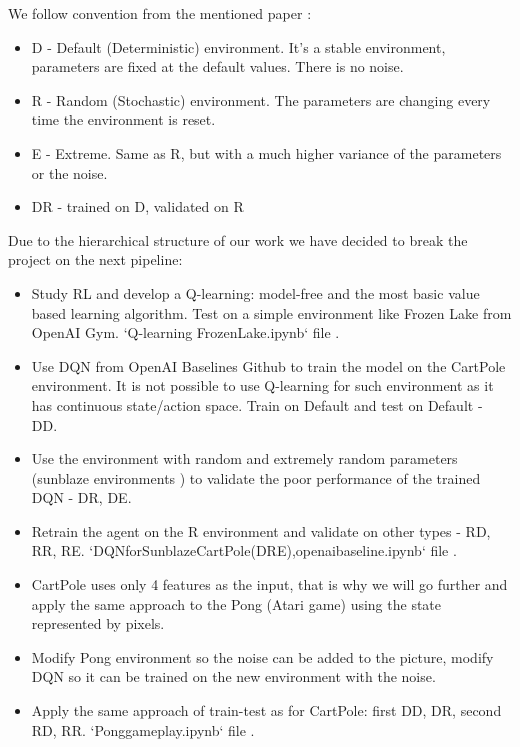 We follow convention from the mentioned paper \cite{GeneralizationPaper}:
\begin{itemize}
    \item D - Default (Deterministic) environment. It's a stable environment, parameters are fixed at the default values. There is no noise.
    \item R - Random (Stochastic) environment. The parameters are changing every time the environment is reset.
    \item E - Extreme. Same as R, but with a much higher variance of the parameters or the noise.
    \item DR - trained on D, validated on R
\end{itemize}

Due to the hierarchical structure of our work we have decided to break the project on the next pipeline:
\begin{itemize}
    \item Study RL and develop a Q-learning: model-free and the most basic value based learning algorithm. Test on a simple environment like Frozen Lake from OpenAI Gym. `Q-learning FrozenLake.ipynb` file \cite{Project}.
    \item Use DQN from OpenAI Baselines Github to train the model on the CartPole environment. It is not possible to use Q-learning for such environment as it has continuous state/action space. Train on Default and test on Default - DD.
    \item Use the environment with random and extremely random parameters (sunblaze environments \cite{Sunblaze}) to validate the poor performance of the trained DQN - DR, DE.
    \item Retrain the agent on the R environment and validate on other types - RD, RR, RE. `DQN\textunderscore for\textunderscore Sunblaze\textunderscore CartPole\textunderscore (DRE),\textunderscore openai\textunderscore baseline.ipynb` file \cite{Project}.
    \item CartPole uses only 4 features as the input, that is why we will go further and apply the same approach to the Pong (Atari game) using the state represented by pixels.
    \item Modify Pong environment so the noise can be added to the picture, modify DQN so it can be trained on the new environment with the noise.
    \item Apply the same approach of train-test as for CartPole: first DD, DR, second RD, RR. `Pong\textunderscore game\textunderscore play.ipynb` file \cite{Project}.
\end{itemize}

